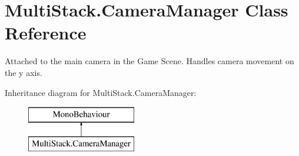 \hypertarget{class_multi_stack_1_1_camera_manager}{}\section{Multi\+Stack.\+Camera\+Manager Class Reference}
\label{class_multi_stack_1_1_camera_manager}


Attached to the main camera in the Game Scene. Handles camera movement on the y axis.  


Inheritance diagram for Multi\+Stack.\+Camera\+Manager\+:\begin{figure}[H]
\begin{center}
\leavevmode
\includegraphics[height=2.000000cm]{class_multi_stack_1_1_camera_manager}
\end{center}
\end{figure}
